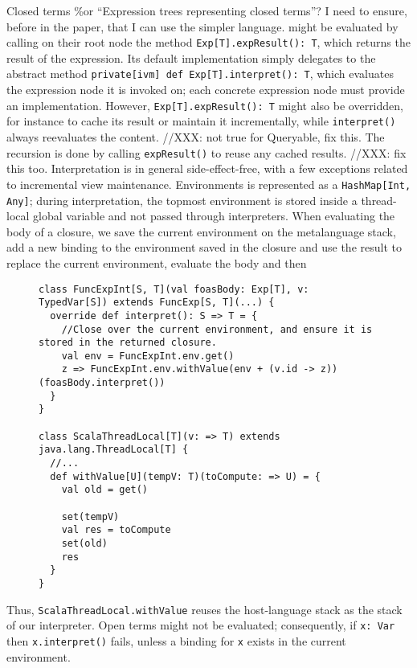 \documentclass[preprint,authoryear,10pt]{sigplanconf}
\begin{document}
Closed terms \%or ``Expression trees representing closed terms''? I need
to ensure, before in the paper, that I can use the simpler language.
might be evaluated by calling on their root node the method
\texttt{Exp{[}T{]}.expResult(): T}, which returns the result of the
expression. Its default implementation simply delegates to the abstract
method \texttt{private{[}ivm{]} def Exp{[}T{]}.interpret(): T}, which
evaluates the expression node it is invoked on; each concrete expression
node must provide an implementation. However,
\texttt{Exp{[}T{]}.expResult(): T} might also be overridden, for
instance to cache its result or maintain it incrementally, while
\texttt{interpret()} always reevaluates the content. //XXX: not true for
Queryable, fix this. The recursion is done by calling
\texttt{expResult()} to reuse any cached results. //XXX: fix this too.
Interpretation is in general side-effect-free, with a few exceptions
related to incremental view maintenance. Environments is represented as
a \texttt{HashMap{[}Int, Any{]}}; during interpretation, the topmost
environment is stored inside a thread-local global variable and not
passed through interpreters. When evaluating the body of a closure, we
save the current environment on the metalanguage stack, add a new
binding to the environment saved in the closure and use the result to
replace the current environment, evaluate the body and then

\begin{figure}
\begin{lstlisting}
class FuncExpInt[S, T](val foasBody: Exp[T], v: TypedVar[S]) extends FuncExp[S, T](...) {
  override def interpret(): S => T = {
    //Close over the current environment, and ensure it is stored in the returned closure.
    val env = FuncExpInt.env.get()
    z => FuncExpInt.env.withValue(env + (v.id -> z))(foasBody.interpret())
  }
}

class ScalaThreadLocal[T](v: => T) extends java.lang.ThreadLocal[T] {
  //...
  def withValue[U](tempV: T)(toCompute: => U) = {
    val old = get()

    set(tempV)
    val res = toCompute
    set(old)
    res
  }
}
\end{lstlisting}
\end{figure}
Thus,
\texttt{ScalaThreadLocal.withValue} reuses the host-language stack as
the stack of our interpreter. Open terms might not be evaluated;
consequently, if \texttt{x: Var} then \texttt{x.interpret()} fails,
unless a binding for \texttt{x} exists in the current environment.
\end{document}

